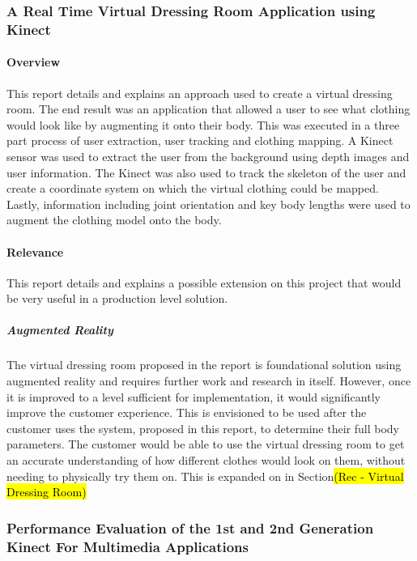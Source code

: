 \subsubsection{A Real Time Virtual Dressing Room Application using Kinect \cite{virtualDress2012}}

\paragraph{Overview}
This report details and explains an approach used to create a virtual dressing room. The end result was an application that allowed a user to see what clothing would look like by augmenting it onto their body. This was executed in a three part process of user extraction, user tracking and clothing mapping. A Kinect sensor was used to extract the user from the background using depth images and user information. The Kinect was also used to track the skeleton of the user and create a coordinate system on which the virtual clothing could be mapped. Lastly, information including joint orientation and key body lengths were used to augment the clothing model onto the body.  

\paragraph{Relevance}
This report details and explains a possible extension on this project that would be very useful in a production level solution. 

\subparagraph{Augmented Reality}
The virtual dressing room proposed in the report is foundational solution using augmented reality and requires further work and research in itself. However, once it is improved to a level sufficient for implementation, it would significantly improve the customer experience. This is envisioned to be used after the customer uses the system, proposed in this report, to determine their full body parameters. The customer would be able to use the virtual dressing room to get an accurate understanding of how different clothes would look on them, without needing to physically try them on. This is expanded on in Section\hl{(Rec - Virtual Dressing Room)} 

\subsubsection{Performance Evaluation of the 1st and 2nd Generation Kinect For Multimedia Applications \cite{kinectComp2011}}

